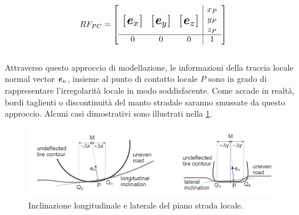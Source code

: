 %
\begin{equation}
RF_{PC} = \left[
\begin{array}{ccc|c}
& & & x_P\\
\multirow{3}{*}{\raisebox{20mm}{\scalebox{1.5}{$\left[\textbf{\textit{e}}_x\right]$}}} & \multirow{3}{*}{\raisebox{20mm}{\scalebox{1.5}{$\left[\textbf{\textit{e}}_y\right]$}}} & \multirow{3}{*}{\raisebox{20mm}{\scalebox{1.5}{$\left[\textbf{\textit{e}}_z\right]$}}} & y_P\\
& & & z_P\\ \hline
0 & 0 & 0 & 1
\end{array}\right]
\end{equation}\\
Attraverso questo approccio di modellazione, le informazioni della traccia locale normal vector $\textbf{\textit{e}}_{n}$, insieme al punto di contatto locale $P$ sono in grado di rappresentare l'irregolarità locale in modo soddisfacente. Come accade in realtà, bordi taglienti o discontinuità del manto stradale saranno smussate da questo approccio. Alcuni casi dimostrativi sono illustrati nella \figurename{  \ref{localplane}}.

\begin{figure}[h]
	\centering
	\includegraphics[width=\linewidth]{Figures/local_plane}
	\caption{Inclinazione longitudinale e laterale del piano strada locale.}
	\label{localplane}
\end{figure}
